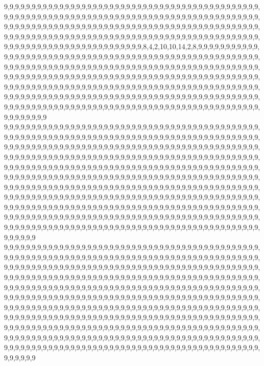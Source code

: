 9,9,9,9,9,9,9,9,9,9,9,9,9,9,9,9,9,9,9,9,9,9,9,9,9,9,9,9,9,9,9,9,9,9,9,9,9,9,9,9,9,9,9,9,9,9,9,9,9,9,9,9,9,9,9,9,9,9,9,9,9,9,9,9,9,9,9,9,9,9,9,9,9,9,9,9,9,9,9,9,9,9,9,9,9,9,9,9,9,9,9,9,9,9,9,9,9,9,9,9,9,9,9,9,9,9,9,9,9,9,9,9,9,9,9,9,9,9,9,9,9,9,9,9,9,9,9,9,9,9,9,9,9,9,9,9,9,9,9,9,9,9,9,9,9,9,9,9,9,9,9,9,9,9,9,9,9,9,9,9,9,9,9,9,9,9,9,9,9,9,9,9,9,9,9,9,9,9,9,9,9,9,9,9,9,9,9,9,9,9,9,9,9,9,9,9,9,9,9,9,9,9,9,9,9,9,9,9,9,8,4,2,10,10,14,2,8,9,9,9,9,9,9,9,9,9,9,9,9,9,9,9,9,9,9,9,9,9,9,9,9,9,9,9,9,9,9,9,9,9,9,9,9,9,9,9,9,9,9,9,9,9,9,9,9,9,9,9,9,9,9,9,9,9,9,9,9,9,9,9,9,9,9,9,9,9,9,9,9,9,9,9,9,9,9,9,9,9,9,9,9,9,9,9,9,9,9,9,9,9,9,9,9,9,9,9,9,9,9,9,9,9,9,9,9,9,9,9,9,9,9,9,9,9,9,9,9,9,9,9,9,9,9,9,9,9,9,9,9,9,9,9,9,9,9,9,9,9,9,9,9,9,9,9,9,9,9,9,9,9,9,9,9,9,9,9,9,9,9,9,9,9,9,9,9,9,9,9,9,9,9,9,9,9,9,9,9,9,9,9,9,9,9,9,9,9,9,9,9,9,9,9,9,9,9,9,9,9,9,9,9,9,9,9,9,9,9,9,9,9,9,9,9,9,9,9,9,9,9,9,9,9,9,9,9,9,9,9,9,9,9,9,9,9,9,9,9,9,9,9,9,9,9,9,9,9,9,9,9,9,9,9,9,9,9,9,9,9,9,9,9,9,9,9,9,9,9,9,9,9,9,9,9,9,9,9,9,9,9,9,9,9,9,9,9,9,9,9,9,9,9,9
9,9,9,9,9,9,9,9,9,9,9,9,9,9,9,9,9,9,9,9,9,9,9,9,9,9,9,9,9,9,9,9,9,9,9,9,9,9,9,9,9,9,9,9,9,9,9,9,9,9,9,9,9,9,9,9,9,9,9,9,9,9,9,9,9,9,9,9,9,9,9,9,9,9,9,9,9,9,9,9,9,9,9,9,9,9,9,9,9,9,9,9,9,9,9,9,9,9,9,9,9,9,9,9,9,9,9,9,9,9,9,9,9,9,9,9,9,9,9,9,9,9,9,9,9,9,9,9,9,9,9,9,9,9,9,9,9,9,9,9,9,9,9,9,9,9,9,9,9,9,9,9,9,9,9,9,9,9,9,9,9,9,9,9,9,9,9,9,9,9,9,9,9,9,9,9,9,9,9,9,9,9,9,9,9,9,9,9,9,9,9,9,9,9,9,9,9,9,9,9,9,9,9,9,9,9,9,9,9,9,9,9,9,9,9,9,9,9,9,9,9,9,9,9,9,9,9,9,9,9,9,9,9,9,9,9,9,9,9,9,9,9,9,9,9,9,9,9,9,9,9,9,9,9,9,9,9,9,9,9,9,9,9,9,9,9,9,9,9,9,9,9,9,9,9,9,9,9,9,9,9,9,9,9,9,9,9,9,9,9,9,9,9,9,9,9,9,9,9,9,9,9,9,9,9,9,9,9,9,9,9,9,9,9,9,9,9,9,9,9,9,9,9,9,9,9,9,9,9,9,9,9,9,9,9,9,9,9,9,9,9,9,9,9,9,9,9,9,9,9,9,9,9,9,9,9,9,9,9,9,9,9,9,9,9,9,9,9,9,9,9,9,9,9,9,9,9,9,9,9,9,9,9,9,9,9,9,9,9,9,9,9,9,9,9,9,9,9,9,9,9,9,9,9,9,9,9,9,9,9,9,9,9,9,9,9,9,9,9,9,9,9,9,9,9,9,9,9,9,9,9,9,9,9,9,9,9,9,9,9,9,9,9,9,9,9,9,9,9,9,9,9,9,9,9,9,9,9,9,9,9,9,9,9,9,9,9,9,9,9,9,9,9,9,9,9,9,9,9,9,9,9,9,9,9,9,9,9,9,9,9,9,9,9,9,9,9,9,9,9,9,9,9,9,9,9,9,9,9,9,9,9
9,9,9,9,9,9,9,9,9,9,9,9,9,9,9,9,9,9,9,9,9,9,9,9,9,9,9,9,9,9,9,9,9,9,9,9,9,9,9,9,9,9,9,9,9,9,9,9,9,9,9,9,9,9,9,9,9,9,9,9,9,9,9,9,9,9,9,9,9,9,9,9,9,9,9,9,9,9,9,9,9,9,9,9,9,9,9,9,9,9,9,9,9,9,9,9,9,9,9,9,9,9,9,9,9,9,9,9,9,9,9,9,9,9,9,9,9,9,9,9,9,9,9,9,9,9,9,9,9,9,9,9,9,9,9,9,9,9,9,9,9,9,9,9,9,9,9,9,9,9,9,9,9,9,9,9,9,9,9,9,9,9,9,9,9,9,9,9,9,9,9,9,9,9,9,9,9,9,9,9,9,9,9,9,9,9,9,9,9,9,9,9,9,9,9,9,9,9,9,9,9,9,9,9,9,9,9,9,9,9,9,9,9,9,9,9,9,9,9,9,9,9,9,9,9,9,9,9,9,9,9,9,9,9,9,9,9,9,9,9,9,9,9,9,9,9,9,9,9,9,9,9,9,9,9,9,9,9,9,9,9,9,9,9,9,9,9,9,9,9,9,9,9,9,9,9,9,9,9,9,9,9,9,9,9,9,9,9,9,9,9,9,9,9,9,9,9,9,9,9,9,9,9,9,9,9,9,9,9,9,9,9,9,9,9,9,9,9,9,9,9,9,9,9,9,9,9,9,9,9,9,9,9,9,9,9,9,9,9,9,9,9,9,9,9,9,9,9,9,9,9,9,9,9,9,9,9,9,9,9,9,9,9,9,9,9,9,9,9,9,9,9,9,9,9,9,9,9,9,9,9,9,9,9,9,9,9,9,9,9,9,9,9,9,9,9,9,9,9,9,9,9,9,9,9,9,9,9,9,9,9,9,9,9,9,9,9,9,9,9,9,9,9,9,9,9,9,9,9,9,9,9,9,9,9,9,9,9,9,9,9,9,9,9,9,9,9,9,9,9,9,9,9,9,9,9,9,9,9,9,9,9,9,9,9,9,9,9,9,9,9,9,9,9,9,9,9,9,9,9,9,9,9,9,9,9,9,9,9,9,9,9,9,9,9,9,9,9,9,9,9,9,9,9,9,9,9,9,9,9,9,9
